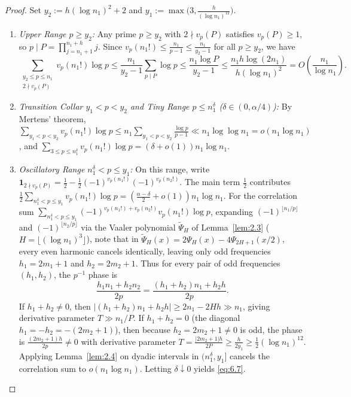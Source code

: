 \documentclass[11pt,reqno]{amsart}
\theoremstyle{remark}
\numberwithin{equation}{section}
\begin{document}
\begin{proof}
Set $y_2 := h(\log n_1)^2 + 2$ and $y_1 := \max\bigl(3, \frac{h}{(\log n_1)^{12}}\bigr)$.
\begin{enumerate}
\item[(1)] \emph{Upper Range $p \ge y_2$:} Any prime $p \ge y_2$ with $2 \nmid v_p(P)$ satisfies $v_p(P) \ge 1$, so $p \mid P = \prod_{j=n_1+1}^{n_1+h} j$. Since $v_p(n_1!) \le \frac{n_1}{p-1} \le \frac{n_1}{y_2-1}$ for all $p \ge y_2$, we have
\[
\sum_{\substack{y_2 \le p \le n_1 \\ 2 \nmid v_p(P)}} v_p(n_1!)\log p \le \frac{n_1}{y_2 - 1} \sum_{p \mid P} \log p \le \frac{n_1\log P}{y_2 - 1} \le \frac{n_1 h\log(2n_1)}{h(\log n_1)^2} = O\!\left(\frac{n_1}{\log n_1}\right).
\]
\item[(2)] \emph{Transition Collar $y_1 < p < y_2$ and Tiny Range $p \le n_1^\delta$ ($\delta \in (0, \alpha/4)$):} By Mertens' theorem, $\sum_{y_1 < p < y_2} v_p(n_1!)\log p \le n_1 \sum_{y_1 < p < y_2} \frac{\log p}{p-1} \ll n_1\log\log n_1 = o(n_1\log n_1)$, and $\sum_{3 \le p \le n_1^\delta} v_p(n_1!)\log p = (\delta + o(1))n_1\log n_1$.
\item[(3)] \emph{Oscillatory Range $n_1^\delta < p \le y_1$:} On this range, write $\mathbf{1}_{2 \nmid v_p(P)} = \frac{1}{2} - \frac{1}{2}(-1)^{v_p(n_1!)}(-1)^{v_p(n_2!)}$. The main term $\frac{1}{2}$ contributes $\frac{1}{2}\sum_{n_1^\delta < p \le y_1} v_p(n_1!)\log p = (\frac{\alpha-\delta}{2} + o(1))n_1\log n_1$. For the correlation sum $\sum_{n_1^\delta < p \le y_1} (-1)^{v_p(n_1!) + v_p(n_2!)} v_p(n_1!)\log p$, expanding $(-1)^{\lfloor n_1/p \rfloor}$ and $(-1)^{\lfloor n_2/p \rfloor}$ via the Vaaler polynomial $\widetilde{\Psi}_H$ of Lemma~\ref{lem:2.3} ($H = \lfloor (\log n_1)^3 \rfloor$), note that in $\widetilde{\Psi}_H(x) = 2\Psi_H(x) - 4\Psi_{2H+1}(x/2)$, every even harmonic cancels identically, leaving only odd frequencies $h_1 = 2m_1 + 1$ and $h_2 = 2m_2 + 1$. Thus for every pair of odd frequencies $(h_1, h_2)$, the $p^{-1}$ phase is
\[
\frac{h_1 n_1 + h_2 n_2}{2p} = \frac{(h_1 + h_2)n_1 + h_2 h}{2p}.
\]
If $h_1 + h_2 \ne 0$, then $|(h_1 + h_2)n_1 + h_2 h| \ge 2n_1 - 2Hh \gg n_1$, giving derivative parameter $T \gg n_1/P$. If $h_1 + h_2 = 0$ (the diagonal $h_1 = -h_2 = -(2m_2 + 1)$), then because $h_2 = 2m_2 + 1 \ne 0$ is odd, the phase is $\frac{(2m_2+1)h}{2p} \ne 0$ with derivative parameter $T = \frac{|2m_2+1|h}{2P} \ge \frac{h}{2y_1} \ge \frac{1}{2}(\log n_1)^{12}$. Applying Lemma~\ref{lem:2.4} on dyadic intervals in $(n_1^\delta, y_1]$ cancels the correlation sum to $o(n_1\log n_1)$. Letting $\delta \downarrow 0$ yields \eqref{eq:6.7}.
\end{enumerate}
\end{proof}
\end{document}
